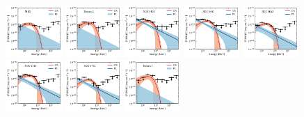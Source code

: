 \documentclass[doublespace,nopageskip]{VTthesis}
\begin{document}
\begin{appendices}
\begin{figure}
\includegraphics[width=0.19\textwidth]{Figures/Globular/spectra/2comp_8.pdf}
\includegraphics[width=0.19\textwidth]{Figures/Globular/spectra/2comp_28.pdf}
\includegraphics[width=0.19\textwidth]{Figures/Globular/spectra/2comp_18.pdf}
\includegraphics[width=0.19\textwidth]{Figures/Globular/spectra/2comp_19.pdf}
\includegraphics[width=0.19\textwidth]{Figures/Globular/spectra/2comp_22.pdf}
\includegraphics[width=0.19\textwidth]{Figures/Globular/spectra/2comp_13.pdf}
\includegraphics[width=0.19\textwidth]{Figures/Globular/spectra/2comp_24.pdf}
\includegraphics[width=0.19\textwidth]{Figures/Globular/spectra/2comp_27.pdf}

\end{figure}
\end{appendices}
\end{document}
